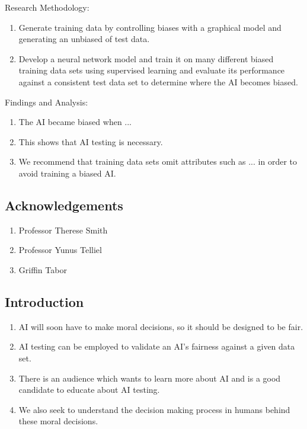 \documentclass{article}
\begin{document}
Research Methodology:
\begin{enumerate}
    \item Generate training data by controlling biases with a graphical model and generating an unbiased of test data.
    \item Develop a neural network model and train it on many different biased training data sets using supervised learning and evaluate its performance against a consistent test data set to determine where the AI becomes biased.
\end{enumerate}

Findings and Analysis:
\begin{enumerate}
    \item The AI became biased when ...
    \item This shows that AI testing is necessary.
    \item We recommend that training data sets omit attributes such as ... in order to avoid training a biased AI.
\end{enumerate}

\subsection{Acknowledgements}

\begin{enumerate}
    \item Professor Therese Smith
    \item Professor Yunus Telliel
    \item Griffin Tabor
\end{enumerate}

\subsection{Introduction}

\begin{enumerate}
    \item AI will soon have to make moral decisions, so it should be designed to be fair.
    \item AI testing can be employed to validate an AI's fairness against a given data set.
    \item There is an audience which wants to learn more about AI and is a good candidate to educate about AI testing.
    \item We also seek to understand the decision making process in humans behind these moral decisions.
\end{enumerate}
\end{document}
